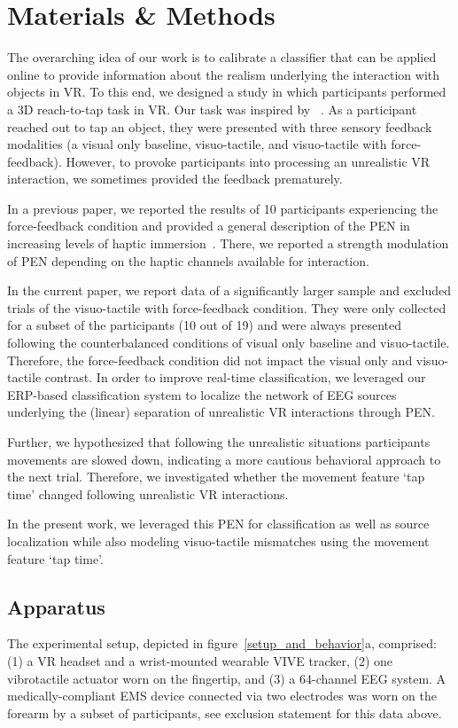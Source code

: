 \section{Materials \& Methods}

The overarching idea of our work is to calibrate a classifier that can be applied online to provide information about the realism underlying the interaction with objects in VR. To this end, we designed a study in which participants performed a 3D reach-to-tap task in VR. Our task was inspired by ~\cite{Singh2018-qi}. As a participant reached out to tap an object, they were presented with three sensory feedback modalities (a visual only baseline, visuo-tactile, and visuo-tactile with force-feedback). However, to provoke participants into processing an unrealistic VR interaction, we sometimes provided the feedback prematurely.

In a previous paper, we reported the results of 10 participants experiencing the force-feedback condition and provided a general description of the PEN in increasing levels of haptic immersion~\cite{Gehrke2019-og}. There, we reported a strength modulation of PEN depending on the haptic channels available for interaction.

In the current paper, we report data of a significantly larger sample and excluded trials of the visuo-tactile with force-feedback condition. They were only collected for a subset of the participants (10 out of 19) and were always presented following the counterbalanced conditions of visual only baseline and visuo-tactile. Therefore, the force-feedback condition did not impact the visual only and visuo-tactile contrast. In order to improve real-time classification, we leveraged our ERP-based classification system to localize the network of EEG sources underlying the (linear) separation of unrealistic VR interactions through PEN.

Further, we hypothesized that following the unrealistic situations participants movements are slowed down, indicating a more cautious behavioral approach to the next trial. Therefore, we investigated whether the movement feature `tap time' changed following unrealistic VR interactions.

In the present work, we leveraged this PEN for classification as well as source localization while also modeling visuo-tactile mismatches using the movement feature `tap time'.

\subsection{Apparatus}
The experimental setup, depicted in figure~\ref{setup_and_behavior}a, comprised: (1) a VR headset and a wrist-mounted wearable VIVE tracker, (2) one vibrotactile actuator worn on the fingertip, and (3) a 64-channel EEG system. A medically-compliant EMS device connected via two electrodes was worn on the forearm by a subset of participants, see exclusion statement for this data above.

